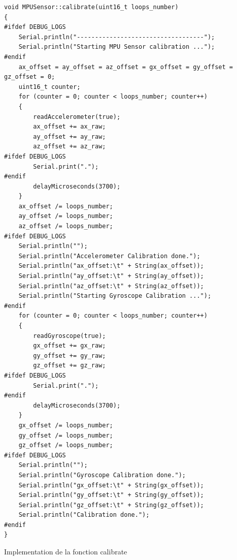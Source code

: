 \begin{listing}[!htpb]
	\begin{verbatim}
void MPUSensor::calibrate(uint16_t loops_number)
{
#ifdef DEBUG_LOGS
	Serial.println("-----------------------------------");
	Serial.println("Starting MPU Sensor calibration ...");
#endif
	ax_offset = ay_offset = az_offset = gx_offset = gy_offset = gz_offset = 0;
	uint16_t counter;
	for (counter = 0; counter < loops_number; counter++)
	{
		readAccelerometer(true);
		ax_offset += ax_raw;
		ay_offset += ay_raw;
		az_offset += az_raw;
#ifdef DEBUG_LOGS
		Serial.print(".");
#endif
		delayMicroseconds(3700);
	}
	ax_offset /= loops_number;
	ay_offset /= loops_number;
	az_offset /= loops_number;
#ifdef DEBUG_LOGS
	Serial.println("");
	Serial.println("Accelerometer Calibration done.");
	Serial.println("ax_offset:\t" + String(ax_offset));
	Serial.println("ay_offset:\t" + String(ay_offset));
	Serial.println("az_offset:\t" + String(az_offset));
	Serial.println("Starting Gyroscope Calibration ...");
#endif
	for (counter = 0; counter < loops_number; counter++)
	{
		readGyroscope(true);
		gx_offset += gx_raw;
		gy_offset += gy_raw;
		gz_offset += gz_raw;
#ifdef DEBUG_LOGS
		Serial.print(".");
#endif
		delayMicroseconds(3700);
	}
	gx_offset /= loops_number;
	gy_offset /= loops_number;
	gz_offset /= loops_number;
#ifdef DEBUG_LOGS
	Serial.println("");
	Serial.println("Gyroscope Calibration done.");
	Serial.println("gx_offset:\t" + String(gx_offset));
	Serial.println("gy_offset:\t" + String(gy_offset));
	Serial.println("gz_offset:\t" + String(gz_offset));
	Serial.println("Calibration done.");
#endif
}
	\end{verbatim}
	\caption{Implementation de la fonction calibrate}
	\label{listing:mpu-calibrate}
\end{listing}

\newpage

